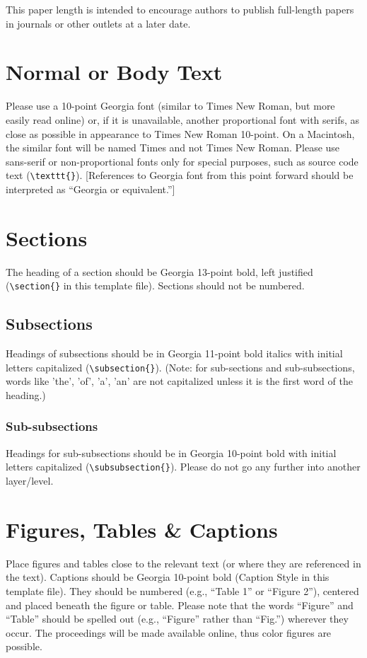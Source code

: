 \documentclass{icis}
\begin{document}
This paper length is intended to encourage authors to publish full-length papers
in journals or other outlets at a later date.

\section{Normal or Body Text}
Please use a 10-point Georgia font (similar to Times New Roman, but more easily
read online) or, if it is unavailable, another proportional font with serifs, as
close as possible in appearance to Times New Roman 10-point. On a Macintosh, the
similar font will be named Times and not Times New Roman. Please use sans-serif
or non-proportional fonts only for special purposes, such as source code text
(\texttt{\textbackslash texttt\{\}}). [References to Georgia font from this
point forward should be interpreted as ``Georgia or equivalent.'']

\section{Sections}
The heading of a section should be Georgia 13-point bold, left justified
(\texttt{\textbackslash section\{\}} in this template file).  Sections should not be numbered.

\subsection{Subsections}
Headings of subsections should be in Georgia 11-point bold italics with initial
letters capitalized (\texttt{\textbackslash subsection\{\}}). (Note: for
sub-sections and sub-subsections, words like 'the', 'of', 'a', 'an' are not
capitalized unless it is the first word of the heading.)

\subsubsection{Sub-subsections}
Headings for sub-subsections should be in Georgia 10-point bold with initial
letters capitalized (\texttt{\textbackslash subsubsection\{\}}). Please do not
go any further into another layer/level.

\section{Figures, Tables \& Captions}
Place figures and tables close to the relevant text (or where they are
referenced in the text).  Captions should be Georgia 10-point bold (Caption
Style in this template file).  They should be numbered (e.g., ``Table 1'' or
``Figure 2''), centered and placed beneath the figure or table.  Please note that
the words ``Figure'' and ``Table'' should be spelled out (e.g., ``Figure'' rather than
``Fig.'') wherever they occur. The proceedings will be made available online, thus
color figures are possible.
\end{document}

